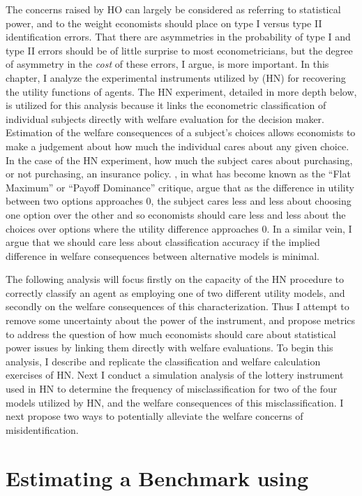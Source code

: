\documentclass[../main.tex]{subfiles}
\begin{document}
The concerns raised by HO can largely be considered as referring to statistical power, and to the weight economists should place on type I versus type II identification errors.
That there are asymmetries in the probability of type I and type II errors should be of little surprise to most econometricians, but the degree of asymmetry in the \textit{cost} of these errors, I argue, is more important.
In this chapter, I analyze the experimental instruments utilized by \textcite{Harrison2016} (HN) for recovering the utility functions of agents.
The HN experiment, detailed in more depth below, is utilized for this analysis because it links the econometric classification of individual subjects directly with welfare evaluation for the decision maker.
Estimation of the welfare consequences of a subject's choices allows economists to make a judgement about how much the individual cares about any given choice.
In the case of the HN experiment, how much the subject cares about purchasing, or not purchasing, an insurance policy.
\textcite{Harrison1989, Harrison1992}, in what has become known as the \enquote{Flat Maximum} or \enquote{Payoff Dominance} critique, argue that as the difference in utility between two options approaches 0, the subject cares less and less about choosing one option over the other and so economists should care less and less about the choices over options where the utility difference approaches 0.
In a similar vein, I argue that we should care less about classification accuracy if the implied difference in welfare consequences between alternative models is minimal.

The following analysis will focus firstly on the capacity of the HN procedure to correctly classify an agent as employing one of two different utility models, and secondly on the welfare consequences of this characterization.
Thus I attempt to remove some uncertainty about the power of the instrument, and propose metrics to address the question of how much economists should care about statistical power issues by linking them directly with welfare evaluations.
To begin this analysis, I describe and replicate the classification and welfare calculation exercises of HN.
Next I conduct a simulation analysis of the lottery instrument used in HN to determine the frequency of misclassification for two of the four models utilized by HN, and the welfare consequences of this misclassification.
I next propose two ways to potentially alleviate the welfare concerns of misidentification.

\section{Estimating a Benchmark using \texorpdfstring{\textcite{Harrison2016}}{Harrison and Ng (2015)}}
\label{sec4:Bench}
\end{document}
